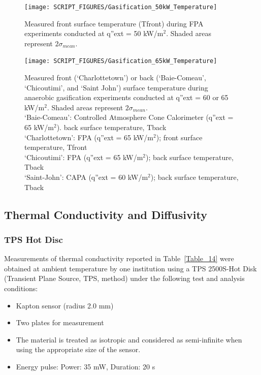 \documentclass{book}
\begin{document}
\begin{figure}
  \centering
  \texttt{[image: SCRIPT\_FIGURES/Gasification\_50kW\_Temperature]}
  \caption{Measured front surface temperature (Tfront) during FPA experiments conducted at q”ext = 50 kW/m$^2$. Shaded areas represent $2\sigma_{mean}$.}
  \label{Fig:Gasification_50kW_Temperature}
\end{figure}

\begin{figure}
  \centering
  \texttt{[image: SCRIPT\_FIGURES/Gasification\_65kW\_Temperature]}
  \caption{Measured front (‘Charlottetown’) or back (‘Baie-Comeau’, ‘Chicoutimi’, and ‘Saint John’) surface temperature during anaerobic gasification experiments conducted at q”ext = 60 or 65 kW/m$^2$. Shaded areas represent $2\sigma_{mean}$. \\
 ‘Baie-Comeau’:  Controlled Atmosphere Cone Calorimeter (q”ext = 65 kW/m$^2$). back surface temperature, Tback \\
‘Charlottetown’:  FPA (q”ext = 65 kW/m$^2$); front surface temperature, Tfront \\
‘Chicoutimi’:   FPA (q”ext = 65 kW/m$^2$); back surface temperature, Tback \\
‘Saint-John’:   CAPA (q”ext = 60 kW/m$^2$); back surface temperature, Tback}
  \label{Fig:Gasification_65kW_Temperature}
\end{figure}


\subsection{Thermal Conductivity and Diffusivity}

\subsubsection{TPS Hot Disc}

Measurements of thermal conductivity reported in Table~\ref{Table_14} were obtained at ambient temperature by one institution using a TPS 2500S-Hot Disk (Transient Plane Source, TPS, method) under the following test and analysis conditions:
\begin{itemize}
 \item Kapton sensor (radius 2.0 mm)
 \item Two plates for measurement
 \item The material is treated as isotropic and considered as semi-infinite when using the appropriate size of the sensor.
 \item Energy pulse: Power: 35 mW, Duration: 20 s
\end{itemize}
\end{document}
